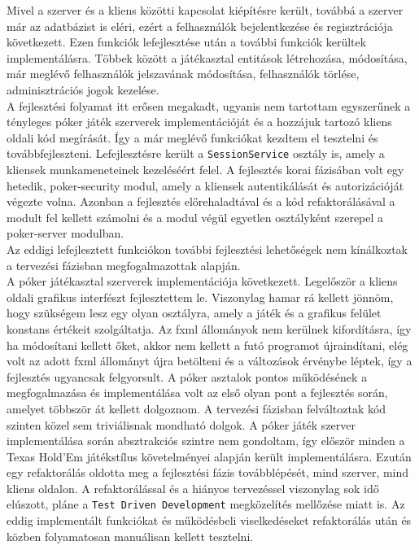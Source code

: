 Mivel a szerver és a kliens közötti kapcsolat kiépítésre került, továbbá a szerver már az adatbázist is eléri, ezért a felhasználók bejelentkezése és regisztrációja következett. Ezen funkciók lefejlesztése után a további funkciók kerültek implementálásra. Többek között a játékasztal entitások létrehozása, módosítása, már meglévő felhasználók jelszavának módosítása, felhasználók törlése, adminisztrációs jogok kezelése. \\
A fejlesztési folyamat itt erősen megakadt, ugyanis nem tartottam egyszerűnek a tényleges póker játék szerverek implementációját és a hozzájuk tartozó kliens oldali kód megírását. Így a már meglévő funkciókat kezdtem el tesztelni és továbbfejleszteni. Lefejlesztésre került a \texttt{SessionService} osztály is, amely a kliensek munkameneteinek kezeléséért felel. A fejlesztés korai fázisában volt egy hetedik, poker-security modul, amely a kliensek autentikálását és autorizációját végezte volna. Azonban a fejlesztés előrehaladtával és a kód refaktorálásával a modult fel kellett számolni és a modul végül egyetlen osztályként szerepel a poker-server modulban. \\
Az eddigi lefejlesztett funkciókon további fejlesztési lehetőségek nem kínálkoztak a tervezési fázisban megfogalmazottak alapján. \\ 
A póker játékasztal szerverek implementációja következett. Legelőször a kliens oldali grafikus interfészt fejlesztettem le. Viszonylag hamar rá kellett jönnöm, hogy szükségem lesz egy olyan osztályra, amely a játék és a grafikus felület konstans értékeit szolgáltatja. Az fxml állományok nem kerülnek kifordításra, így ha módosítani kellett őket, akkor nem kellett a futó programot újraindítani, elég volt az adott fxml állományt újra betölteni és a változások érvénybe léptek, így a fejlesztés ugyancsak felgyorsult. A póker asztalok pontos működésének a megfogalmazása és implementálása volt az első olyan pont a fejlesztés során, amelyet többször át kellett dolgoznom. A tervezési fázisban felváltoztak kód szinten közel sem triviálisnak mondható dolgok. A póker játék szerver implementálása során absztrakciós szintre nem gondoltam, így először minden a Texas Hold'Em játékstílus követelményei alapján került implementálásra. Ezután egy refaktorálás oldotta meg a fejlesztési fázis továbblépését, mind szerver, mind kliens oldalon. A refaktorálással és a hiányos tervezéssel viszonylag sok idő elúszott, pláne a \texttt{Test Driven Development} megközelítés mellőzése miatt is. Az eddig implementált funkciókat és működésbeli viselkedéseket refaktorálás után és közben folyamatosan manuálisan kellett tesztelni. \\
